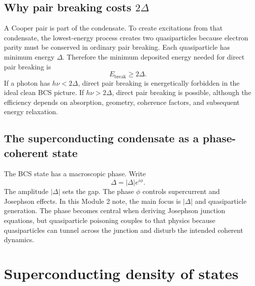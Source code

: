 \documentclass[11pt]{article}
\begin{document}
\subsection{Why pair breaking costs $2\Delta$}
A Cooper pair is part of the condensate. To create excitations from that condensate, the lowest-energy process creates two quasiparticles because electron parity must be conserved in ordinary pair breaking. Each quasiparticle has minimum energy $\Delta$. Therefore the minimum deposited energy needed for direct pair breaking is
\begin{equation}
E_{\mathrm{break}}\ge2\Delta.
\end{equation}
If a photon has $h\nu<2\Delta$, direct pair breaking is energetically forbidden in the ideal clean BCS picture. If $h\nu>2\Delta$, direct pair breaking is possible, although the efficiency depends on absorption, geometry, coherence factors, and subsequent energy relaxation.

\subsection{The superconducting condensate as a phase-coherent state}
The BCS state has a macroscopic phase. Write
\begin{equation}
\Delta=|\Delta|e^{i\phi}.
\end{equation}
The amplitude $|\Delta|$ sets the gap. The phase $\phi$ controls supercurrent and Josephson effects. In this Module 2 note, the main focus is $|\Delta|$ and quasiparticle generation. The phase becomes central when deriving Josephson junction equations, but quasiparticle poisoning couples to that physics because quasiparticles can tunnel across the junction and disturb the intended coherent dynamics.

\section{Superconducting density of states}
\end{document}

